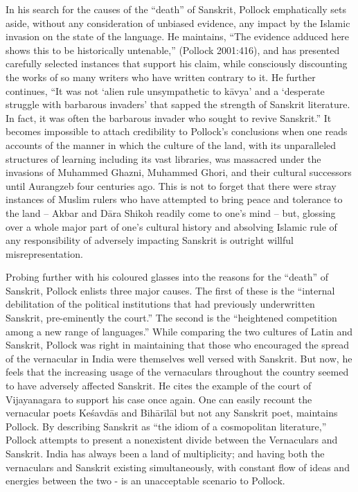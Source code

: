 In his search for the causes of the “death” of Sanskrit, Pollock emphatically sets aside, without any consideration of unbiased evidence, any impact by the Islamic invasion on the state of the language. He maintains, “The evidence adduced here shows this to be historically untenable,” (Pollock 2001:416), and has presented carefully selected instances that support his claim, while consciously discounting the works of so many writers who have written contrary to it. He further continues, “It was not ‘alien rule unsympathetic to kāvya’ and a ‘desperate struggle with barbarous invaders’ that sapped the strength of Sanskrit literature. In fact, it was often the barbarous invader who sought to revive Sanskrit.” It becomes impossible to attach credibility to Pollock’s conclusions when one reads accounts of the manner in which the culture of the land, with its unparalleled structures of learning including its vast libraries, was massacred under the invasions of Muhammed Ghazni, Muhammed Ghori, and their cultural successors until Aurangzeb four centuries ago. This is not to forget that there were stray instances of Muslim rulers who have attempted to bring peace and tolerance to the land – Akbar and Dāra Shikoh readily come to one’s mind – but, glossing over a whole major part of one’s cultural history and absolving Islamic rule of any responsibility of adversely impacting Sanskrit is outright willful misrepresentation.

Probing further with his coloured glasses into the reasons for the “death” of Sanskrit, Pollock enlists three major causes. The first of these is the “internal debilitation of the political institutions that had previously underwritten Sanskrit, pre-eminently the court.” The second is the “heightened competition among a new range of languages.” While comparing the two cultures of Latin and Sanskrit, Pollock was right in maintaining that those who encouraged the spread of the vernacular in India were themselves well versed with Sanskrit. But now, he feels that the increasing usage of the vernaculars throughout the country seemed to have adversely affected Sanskrit. He cites the example of the court of Vijayanagara to support his case once again. One can easily recount the vernacular poets Keśavdās and Bihārīlāl but not any Sanskrit poet, maintains Pollock. By describing Sanskrit as “the idiom of a cosmopolitan literature,” Pollock attempts to present a nonexistent divide between the Vernaculars and Sanskrit. India has always been a land of multiplicity; and having both the vernaculars and Sanskrit existing simultaneously, with constant flow of ideas and energies between the two - is an unacceptable scenario to Pollock. 

